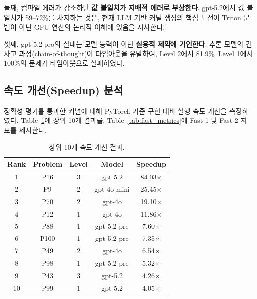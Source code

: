 \documentclass[sigplan,screen,review,anonymous]{acmart}
\begin{document}
둘째, 컴파일 에러가 감소하면 \textbf{값 불일치가 지배적 에러로 부상한다}. gpt-5.2에서 값 불일치가 59--72\%를 차지하는 것은, 현재 LLM 기반 커널 생성의 핵심 도전이 Triton 문법이 아닌 GPU 연산의 논리적 이해에 있음을 시사한다.

셋째, gpt-5.2-pro의 실패는 모델 능력이 아닌 \textbf{실용적 제약에 기인한다}. 추론 모델의 긴 사고 과정(chain-of-thought)이 타임아웃을 유발하여, Level 2에서 81.9\%, Level 1에서 100\%의 문제가 타임아웃으로 실패하였다.

\subsection{속도 개선(Speedup) 분석}

정확성 평가를 통과한 커널에 대해 PyTorch 기준 구현 대비 실행 속도 개선을 측정하였다. Table~\ref{tab:top_speedup}에 상위 10개 결과를, Table~\ref{tab:fast_metrics}에 Fast-1 및 Fast-2 지표를 제시한다.

\begin{table}[t]
\centering
\caption{상위 10개 속도 개선 결과.}
\label{tab:top_speedup}
\begin{tabular}{ccccc}
\toprule
\textbf{Rank} & \textbf{Problem} & \textbf{Level} & \textbf{Model} & \textbf{Speedup} \\
\midrule
1 & P16 & 3 & gpt-5.2 & 84.03$\times$ \\
2 & P9 & 2 & gpt-4o-mini & 25.45$\times$ \\
3 & P70 & 2 & gpt-4o & 19.10$\times$ \\
4 & P12 & 1 & gpt-4o & 11.86$\times$ \\
5 & P88 & 1 & gpt-5.2-pro & 7.60$\times$ \\
6 & P100 & 1 & gpt-5.2-pro & 7.35$\times$ \\
7 & P49 & 2 & gpt-4o & 6.54$\times$ \\
8 & P98 & 1 & gpt-5.2-pro & 5.32$\times$ \\
9 & P43 & 3 & gpt-5.2 & 4.26$\times$ \\
10 & P99 & 1 & gpt-5.2 & 4.05$\times$ \\
\bottomrule
\end{tabular}
\end{table}
\end{document}
